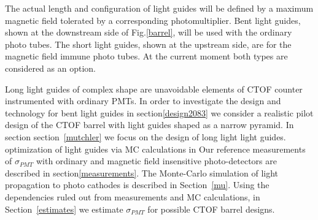  The actual length and configuration 
of  light guides will be  defined by a maximum magnetic field tolerated by a corresponding photomultiplier.
Bent light guides, shown at the downstream side of Fig.\ref{barrel},
 will be used with the  ordinary photo tubes. 
The short light guides, shown at the upstream side, are for the magnetic field immune
photo tubes. At the current moment both types are considered as an option. 


Long  light guides of complex shape 
 are   unavoidable elements of CTOF counter instrumented with ordinary PMTs. 
In order to investigate the design and technology for bent  light guides 
in section\ref{design2083} we  consider  a
realistic pilot design of the  CTOF barrel with  light guides shaped as a narrow pyramid.
In section  section~\ref{mutchler}  we focus on 
the design of long light  light guides.
optimization of  light guides  via MC calculations in
Our reference measurements of  $\sigma_{PMT}$ with ordinary  and  magnetic 
field  insensitive photo-detectors are described in section\ref{measurements}.
The Monte-Carlo simulation of light propagation to photo cathodes is described in Section~\ref{mu}.
Using the  dependencies ruled out from   measurements and MC calculations, in Section~\ref{estimates} we 
estimate   $\sigma_{PMT}$ for possible  CTOF barrel designs.




